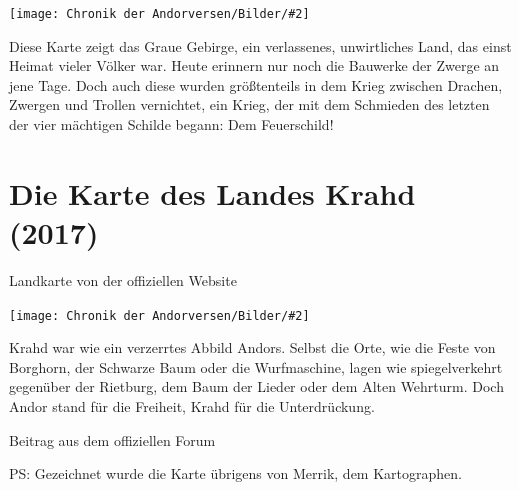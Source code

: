 \documentclass[10pt, a4paper, oneside]{book}
\newcommand{\produkt}[1]{%
    \section{#1}%
    \label{Produkt: #1}%
}
\newcommand{\bildmitts}[2][height=0.32\textwidth,width=0.48\textwidth,keepaspectratio]{%
    \begin{center}
        \texttt{[image: Chronik der Andorversen/Bilder/\#2]}
    \end{center}
}
\begin{document}
\bildmitts[width=\textwidth]{Die Karte des Grauen Gebirges.jpg}

Diese Karte zeigt das Graue Gebirge, ein verlassenes, unwirtliches Land, das einst Heimat vieler Völker war. Heute erinnern nur noch die Bauwerke der Zwerge an jene Tage. Doch auch diese wurden größtenteils in dem Krieg zwischen Drachen, Zwergen und Trollen vernichtet, ein Krieg, der mit dem Schmieden des letzten der vier mächtigen Schilde begann: Dem Feuerschild!

\newpage
\produkt{Die Karte des Landes Krahd (2017)}

\begin{center}
    Landkarte von der offiziellen Website
\end{center}

\bildmitts[width=\textwidth]{Die Karte des Landes Krahd.jpg}

Krahd war wie ein verzerrtes Abbild Andors. Selbst die Orte, wie die Feste von Borghorn, der Schwarze Baum oder die Wurfmaschine, lagen wie spiegelverkehrt gegenüber der Rietburg, dem Baum der Lieder oder dem Alten Wehrturm. Doch Andor stand für die Freiheit, Krahd für die Unterdrückung.

\begin{center}
    Beitrag aus dem offiziellen Forum
\end{center}

PS: Gezeichnet wurde die Karte übrigens von Merrik, dem Kartographen.


\newpage
\end{document}
